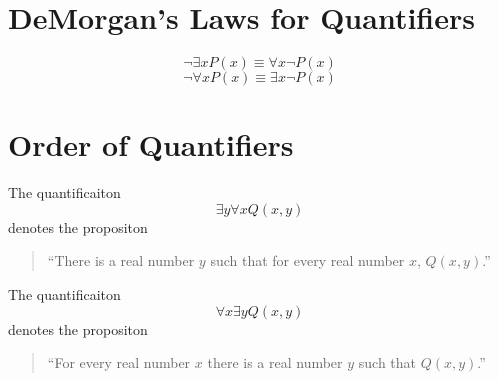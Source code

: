 \section{DeMorgan's Laws for Quantifiers}

\begin{equation}
  \neg \exists x P(x) \equiv \forall x \neg P(x)
\end{equation}
\begin{equation}
  \neg \forall x P(x) \equiv \exists x \neg P(x)
\end{equation}

\section{Order of Quantifiers}

The quantificaiton
\begin{equation}
  \exists y \forall x Q(x, y)
\end{equation}
denotes the propositon
\begin{quote}
  ``There is a real number $y$ such that for every real number $x$, $Q(x, y)$.''
\end{quote}

The quantificaiton
\begin{equation}
  \forall x \exists y Q(x, y)
\end{equation}
denotes the propositon
\begin{quote}
  ``For every real number $x$ there is a real number $y$ such that $Q(x, y)$.''
\end{quote}

